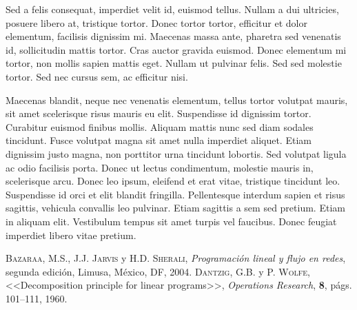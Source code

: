\documentclass[a4paper, twoside]{article}
\begin{document}
Sed a felis consequat, imperdiet velit id, euismod tellus. Nullam a dui ultricies, posuere libero at, tristique tortor. Donec tortor tortor, efficitur et dolor elementum, facilisis dignissim mi. Maecenas massa ante, pharetra sed venenatis id, sollicitudin mattis tortor. Cras auctor gravida euismod. Donec elementum mi tortor, non mollis sapien mattis eget. Nullam ut pulvinar felis. Sed sed molestie tortor. Sed nec cursus sem, ac efficitur nisi.

Maecenas blandit, neque nec venenatis elementum, tellus tortor volutpat mauris, sit amet scelerisque risus mauris eu elit. Suspendisse id dignissim tortor. Curabitur euismod finibus mollis. Aliquam mattis nunc sed diam sodales tincidunt. Fusce volutpat magna sit amet nulla imperdiet aliquet. Etiam dignissim justo magna, non porttitor urna tincidunt lobortis. Sed volutpat ligula ac odio facilisis porta. Donec ut lectus condimentum, molestie mauris in, scelerisque arcu. Donec leo ipsum, eleifend et erat vitae, tristique tincidunt leo. Suspendisse id orci et elit blandit fringilla. Pellentesque interdum sapien et risus sagittis, vehicula convallis leo pulvinar. Etiam sagittis a sem sed pretium. Etiam in aliquam elit. Vestibulum tempus sit amet turpis vel faucibus. Donec feugiat imperdiet libero vitae pretium. 

\seccioncolaboradores %

\newpage
\renewcommand\refname{Bibliografía}
\begin{thebibliography}{X}
	 \textsc{Bazaraa, M.S., J.J. Jarvis} y \textsc{H.D. Sherali}, \textit{Programación lineal y flujo en redes}, segunda edición, Limusa, México, DF, 2004.
	 \textsc{Dantzig, G.B.} y \textsc{P. Wolfe}, <<Decomposition principle for linear programs>>, \textit{Operations Research}, \textbf{8}, págs. 101--111, 1960.
\end{thebibliography}
\end{document}
